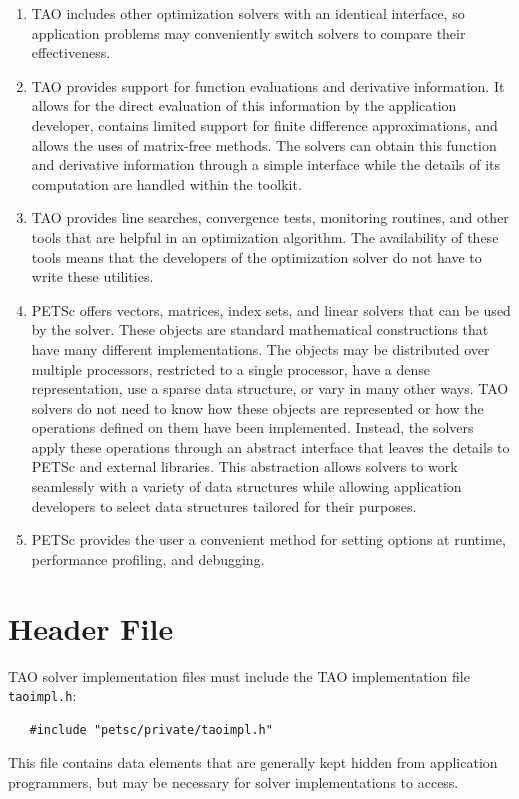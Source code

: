 \documentclass[]{book}
\begin{document}
\begin{enumerate}
\item TAO includes other optimization solvers with an identical interface, 
so application problems may
conveniently switch solvers to compare their effectiveness.

\item TAO provides support for function evaluations and
derivative information.  It allows for the direct evaluation
of this information by the application developer, 
contains limited support for finite difference approximations, and
allows the uses of matrix-free methods.
The solvers can obtain this function and derivative information
through a simple interface  while the details of its computation 
are handled within the toolkit.

\item TAO provides line searches, convergence
tests, monitoring routines, and other tools
that are helpful in an optimization algorithm.
The availability
of these tools means that the developers of the optimization
solver do not have to write these utilities.

\item PETSc offers vectors, matrices, index sets, and linear solvers
that can be used by the solver.  These objects are standard mathematical
constructions that have many different implementations.
The objects may be distributed over multiple processors, restricted to
a single processor, have a dense representation, 
use a sparse data structure, or vary in many other ways.  
TAO solvers do not need to know how
these objects are represented or how the operations defined on them
have been implemented.  Instead, the solvers apply these operations
through an abstract interface that leaves the details to PETSc
and external libraries.
This abstraction allows solvers to work seamlessly with a variety
of data structures while allowing application developers to select 
data structures tailored for their purposes.

\item PETSc provides the user a convenient
method for setting options at runtime, performance profiling, and debugging.

\end{enumerate}

\section{Header File}
TAO solver implementation files must include the TAO implementation file \texttt{taoimpl.h}:
\begin{verbatim}
   #include "petsc/private/taoimpl.h"
\end{verbatim}
This file contains data elements that are generally kept hidden from application
programmers, but may be necessary for solver implementations to access.
\noindent
\end{document}
